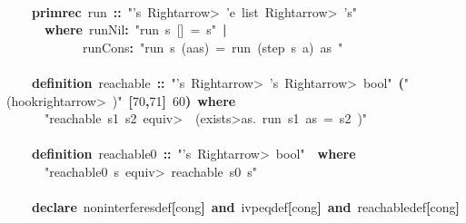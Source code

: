 \documentclass{article}
\newcommand{\syntaxKEYWORDA}[1]{\textcolor[rgb]{0.0,0.4,0.6}{\textbf{#1}}}
\newcommand{\syntaxKEYWORDB}[1]{\textcolor[rgb]{0.0,0.6,0.4}{\textbf{#1}}}
\newcommand{\syntaxLITERALA}[1]{\textcolor[rgb]{1.0,0.0,0.8}{#1}}
\newcommand{\syntaxOPERATOR}[1]{\textcolor[rgb]{0.0,0.0,0.0}{\textbf{#1}}}
\newcommand{\syntaxKEYWORDA}[1]{\textcolor[rgb]{0.0,0.4,0.6}{\textbf{#1}}}
\newcommand{\syntaxKEYWORDB}[1]{\textcolor[rgb]{0.0,0.6,0.4}{\textbf{#1}}}
\newcommand{\syntaxLITERALA}[1]{\textcolor[rgb]{1.0,0.0,0.8}{#1}}
\newcommand{\syntaxOPERATOR}[1]{\textcolor[rgb]{0.0,0.0,0.0}{\textbf{#1}}}
\newcommand{\syntaxKEYWORDA}[1]{\textcolor[rgb]{0.0,0.4,0.6}{\textbf{#1}}}
\newcommand{\syntaxKEYWORDB}[1]{\textcolor[rgb]{0.0,0.6,0.4}{\textbf{#1}}}
\newcommand{\syntaxLITERALA}[1]{\textcolor[rgb]{1.0,0.0,0.8}{#1}}
\newcommand{\syntaxOPERATOR}[1]{\textcolor[rgb]{0.0,0.0,0.0}{\textbf{#1}}}
\newcommand{\syntaxKEYWORDA}[1]{\textcolor[rgb]{0.0,0.4,0.6}{#1}}
\newcommand{\syntaxKEYWORDB}[1]{\textcolor[rgb]{0.0,0.6,0.4}{#1}}
\newcommand{\syntaxLITERALA}[1]{\textcolor[rgb]{1.0,0.0,0.8}{\textbf{#1}}}
\newcommand{\syntaxOPERATOR}[1]{\textcolor[rgb]{0.0,0.0,0.0}{#1}}
\newcommand{\syntaxKEYWORDA}[1]{\textcolor[rgb]{0.0,0.4,0.6}{\textbf{#1}}}
\newcommand{\syntaxKEYWORDB}[1]{\textcolor[rgb]{0.0,0.6,0.4}{\textbf{#1}}}
\newcommand{\syntaxLITERALA}[1]{\textcolor[rgb]{1.0,0.0,0.8}{#1}}
\newcommand{\syntaxOPERATOR}[1]{\textcolor[rgb]{0.0,0.0,0.0}{\textbf{#1}}}
\newcommand{\syntaxKEYWORDA}[1]{\textcolor[rgb]{0.0,0.4,0.6}{\textbf{#1}}}
\newcommand{\syntaxKEYWORDB}[1]{\textcolor[rgb]{0.0,0.6,0.4}{\textbf{#1}}}
\newcommand{\syntaxLITERALA}[1]{\textcolor[rgb]{1.0,0.0,0.8}{#1}}
\newcommand{\syntaxOPERATOR}[1]{\textcolor[rgb]{0.0,0.0,0.0}{\textbf{#1}}}
\begin{document}
\hspace*{\fill}\\
{\ }{\ }{\ }{\ }\syntaxKEYWORDA{primrec}{\ }run{\ }\syntaxOPERATOR{::}{\ }\syntaxLITERALA{"'s{\ }\<Rightarrow>{\ }'e{\ }list{\ }\<Rightarrow>{\ }'s"}\hspace*{\fill}\\
{\ }{\ }{\ }{\ }{\ }{\ }\syntaxKEYWORDB{where}{\ }run\usebox{\underscorebox}Nil\syntaxOPERATOR{:}{\ }\syntaxLITERALA{"run{\ }s{\ }{[}{]}{\ }={\ }s"}{\ }\syntaxOPERATOR{|}\hspace*{\fill}\\
{\ }{\ }{\ }{\ }{\ }{\ }{\ }{\ }{\ }{\ }{\ }{\ }run\usebox{\underscorebox}Cons\syntaxOPERATOR{:}{\ }\syntaxLITERALA{"run{\ }s{\ }(a\usebox{\hashbox}as){\ }={\ }run{\ }(step{\ }s{\ }a){\ }as{\ }"}\hspace*{\fill}\\
\hspace*{\fill}\\
{\ }{\ }{\ }{\ }\syntaxKEYWORDA{definition}{\ }reachable{\ }\syntaxOPERATOR{::}{\ }\syntaxLITERALA{"'s{\ }\<Rightarrow>{\ }'s{\ }\<Rightarrow>{\ }bool"}{\ }\syntaxOPERATOR{(}\syntaxLITERALA{"(\usebox{\underscorebox}{\ }\<hookrightarrow>{\ }\usebox{\underscorebox})"}{\ }\syntaxOPERATOR{{[}}70\syntaxOPERATOR{,}71\syntaxOPERATOR{{]}}{\ }60\syntaxOPERATOR{)}{\ }\syntaxKEYWORDB{where}\hspace*{\fill}\\
{\ }{\ }{\ }{\ }{\ }{\ }\syntaxLITERALA{"reachable{\ }s1{\ }s2{\ }\<equiv>{\ }{\ }(\<exists>as.{\ }run{\ }s1{\ }as{\ }={\ }s2{\ })"}\hspace*{\fill}\\
{\ }{\ }{\ }{\ }\hspace*{\fill}\\
{\ }{\ }{\ }{\ }\syntaxKEYWORDA{definition}{\ }reachable0{\ }\syntaxOPERATOR{::}{\ }\syntaxLITERALA{"'s{\ }\<Rightarrow>{\ }bool"}{\ }{\ }\syntaxKEYWORDB{where}\hspace*{\fill}\\
{\ }{\ }{\ }{\ }{\ }{\ }\syntaxLITERALA{"reachable0{\ }s{\ }\<equiv>{\ }reachable{\ }s0{\ }s"}\hspace*{\fill}\\
{\ }{\ }{\ }{\ }{\ }{\ }\hspace*{\fill}\\
{\ }{\ }{\ }{\ }\syntaxKEYWORDA{declare}{\ }non\usebox{\underscorebox}interferes\usebox{\underscorebox}def\syntaxOPERATOR{{[}}cong\syntaxOPERATOR{{]}}{\ }\syntaxKEYWORDB{and}{\ }ivpeq\usebox{\underscorebox}def\syntaxOPERATOR{{[}}cong\syntaxOPERATOR{{]}}{\ }\syntaxKEYWORDB{and}{\ }reachable\usebox{\underscorebox}def\syntaxOPERATOR{{[}}cong\syntaxOPERATOR{{]}}\hspace*{\fill}\\
\end{document}
